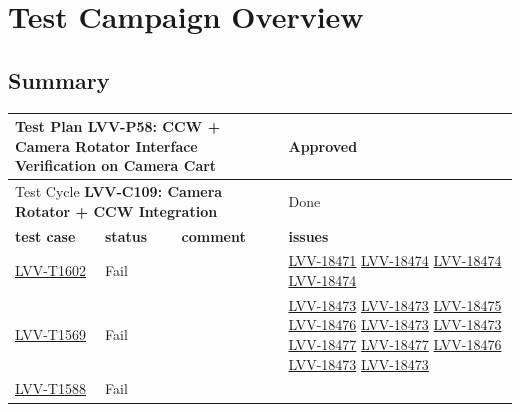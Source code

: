 \documentclass[SE,lsstdraft,STR,toc]{lsstdoc}
\begin{document}
\newpage

\section{Test Campaign Overview}
\label{sect:overview}

\subsection{Summary}
\label{sect:summarytable}

\begin{longtable}{p{2cm}p{2.5cm}p{9cm}p{2.5cm}}
\toprule
\multicolumn{3}{l}{ Test Plan {\bf LVV-P58:  CCW + Camera Rotator Interface Verification on Camera Cart
 }} & Approved \\\hline

  \multicolumn{3}{l}{ Test Cycle {\bf LVV-C109:  Camera Rotator + CCW Integration
 }} & Done \\\hline

  {\bf \footnotesize test case} & {\bf \footnotesize status} & {\bf \footnotesize comment} & {\bf \footnotesize issues} \\\toprule

    \href{https://jira.lsstcorp.org/secure/Tests.jspa#/testCase/LVV-T1602}{LVV-T1602}
    & Fail &
    \begin{minipage}[]{9cm}
    \smallskip
    
    \medskip
    \end{minipage}
    &
          \href{https://jira.lsstcorp.org/browse/LVV-18471}{LVV-18471}
          \href{https://jira.lsstcorp.org/browse/LVV-18474}{LVV-18474}
          \href{https://jira.lsstcorp.org/browse/LVV-18474}{LVV-18474}
          \href{https://jira.lsstcorp.org/browse/LVV-18474}{LVV-18474}
    \\\hline
    \href{https://jira.lsstcorp.org/secure/Tests.jspa#/testCase/LVV-T1569}{LVV-T1569}
    & Fail &
    \begin{minipage}[]{9cm}
    \smallskip
    
    \medskip
    \end{minipage}
    &
          \href{https://jira.lsstcorp.org/browse/LVV-18473}{LVV-18473}
          \href{https://jira.lsstcorp.org/browse/LVV-18473}{LVV-18473}
          \href{https://jira.lsstcorp.org/browse/LVV-18475}{LVV-18475}
          \href{https://jira.lsstcorp.org/browse/LVV-18476}{LVV-18476}
          \href{https://jira.lsstcorp.org/browse/LVV-18473}{LVV-18473}
          \href{https://jira.lsstcorp.org/browse/LVV-18473}{LVV-18473}
          \href{https://jira.lsstcorp.org/browse/LVV-18477}{LVV-18477}
          \href{https://jira.lsstcorp.org/browse/LVV-18477}{LVV-18477}
          \href{https://jira.lsstcorp.org/browse/LVV-18476}{LVV-18476}
          \href{https://jira.lsstcorp.org/browse/LVV-18473}{LVV-18473}
          \href{https://jira.lsstcorp.org/browse/LVV-18473}{LVV-18473}
    \\\hline
    \href{https://jira.lsstcorp.org/secure/Tests.jspa#/testCase/LVV-T1588}{LVV-T1588}
    & Fail &
    \begin{minipage}[]{9cm}
    \smallskip
    

\end{minipage}
\end{longtable}
\end{document}
